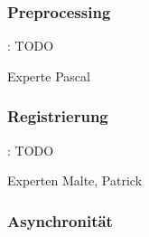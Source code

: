 \documentclass{beamer}
\begin{document}
\subsubsection*{Preprocessing}
\begin{frame}{\subsecname: \subsubsecname}
TODO

Experte Pascal
\end{frame}

\subsubsection*{Registrierung}
\begin{frame}{\subsecname: \subsubsecname}
TODO

Experten Malte, Patrick
\end{frame}

\subsubsection*{Asynchronität}
\end{document}
